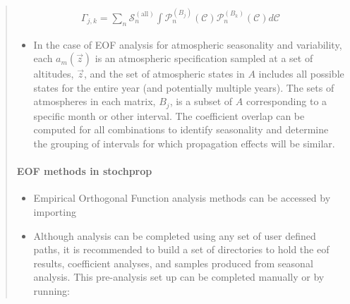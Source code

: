 \documentclass[letterpaper,10pt,english]{sphinxmanual}
\begin{document}
\begin{itemize}
\begin{quote}
\begin{itemize}
\end{itemize}
\begin{equation*}
\begin{split}\Gamma_{j,k}  =  \sum_n{ \mathcal{S}_n^{(\text{all})} \int{\mathcal{P}_n^{(B_j)} \left( \mathcal{C} \right) \mathcal{P}_n^{(B_k)} \left( \mathcal{C} \right) d \mathcal{C} }}\end{split}
\end{equation*}\begin{itemize}
\item {} 
In the case of EOF analysis for atmospheric seasonality and variability, each \(a_m(\vec{z})\) is an atmospheric specification sampled at a set of altitudes, \(\vec{z}\), and the set of atmospheric states in \(A\) includes all possible states for the entire year (and potentially multiple years).  The sets of atmospheres in each matrix, \(B_j\), is a subset of \(A\) corresponding to a specific month or other interval.  The coefficient overlap can be computed for all combinations to identify seasonality and determine the grouping of intervals for which propagation effects will be similar.

\end{itemize}


\paragraph{EOF methods in stochprop}
\label{\detokenize{eofs:eof-methods-in-stochprop}}\begin{itemize}
\item {} 
Empirical Orthogonal Function analysis methods can be accessed by importing 

\item {} 
Although analysis can be completed using any set of user defined paths, it is recommended to build a set of directories to hold the eof results, coefficient analyses, and samples produced from seasonal analysis.  This pre-analysis set up can be completed manually or by running:

\end{itemize}

\begin{sphinxVerbatim}[commandchars=\\\{\}]
 
 
   

   


\end{sphinxVerbatim}
\end{quote}
\end{itemize}
\end{document}
